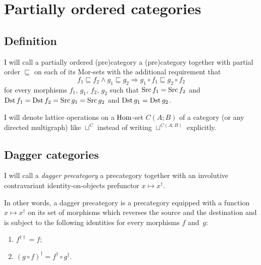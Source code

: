 \section{Partially ordered categories}


\subsection{Definition}
\begin{defn}
I
will call a partially ordered (pre)category a (pre)category together
with partial order $\sqsubseteq$ on each of its Mor-sets with the
additional requirement that
\[
f_{1}\sqsubseteq f_{2}\land g_{1}\sqsubseteq g_{2}\Rightarrow g_{1}\circ f_{1}\sqsubseteq g_{2}\circ f_{2}
\]
for every morphisms $f_{1}$, $g_{1}$, $f_{2}$, $g_{2}$ such that
$\operatorname{Src} f_{1}=\operatorname{Src} f_{2}$ and $\operatorname{Dst} f_{1}=\operatorname{Dst} f_{2}=\operatorname{Src} g_{1}=\operatorname{Src} g_{2}$
and $\operatorname{Dst} g_{1}=\operatorname{Dst} g_{2}$.
\end{defn}
I will denote lattice operations on a $\operatorname{Hom}$-set $C(A;B)$ of a category
(or any directed multigraph) like $\sqcup^{C}$ instead of writing
$\sqcup^{C(A;B)}$ explicitly.


\subsection{Dagger categories}
\begin{defn}
I will call a \emph{dagger precategory}
a precategory together with an involutive contravariant identity-on-objects
prefunctor $x\mapsto x^{\dagger}$.

In other words, a dagger precategory is a precategory equipped with
a function $x\mapsto x^{\dagger}$ on its set of morphisms which reverses
the source and the destination and is subject to the following identities
for every morphisms $f$ and~$g$:
\begin{enumerate}
\item $f^{\dagger\dagger}=f$;
\item $(g\circ f)^{\dagger}=f^{\dagger}\circ g^{\dagger}$.
\end{enumerate}
\end{defn}

